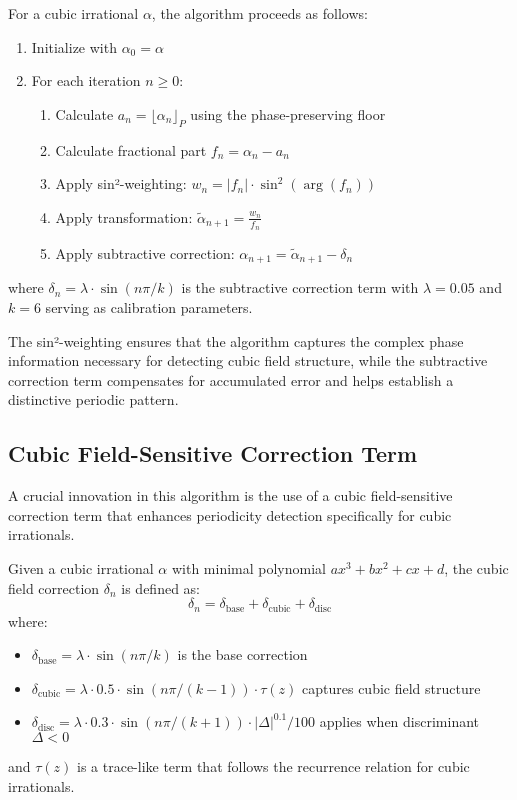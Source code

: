 \begin{algorithm_def}
For a cubic irrational $\alpha$, the algorithm proceeds as follows:
\begin{enumerate}
    \item Initialize with $\alpha_0 = \alpha$
    \item For each iteration $n \geq 0$:
    \begin{enumerate}
        \item Calculate $a_n = \lfloor \alpha_n \rfloor_P$ using the phase-preserving floor
        \item Calculate fractional part $f_n = \alpha_n - a_n$
        \item Apply sin²-weighting: $w_n = |f_n| \cdot \sin^2(\arg(f_n))$
        \item Apply transformation: $\tilde{\alpha}_{n+1} = \frac{w_n}{f_n}$
        \item Apply subtractive correction: $\alpha_{n+1} = \tilde{\alpha}_{n+1} - \delta_n$
    \end{enumerate}
\end{enumerate}
where $\delta_n = \lambda \cdot \sin(n\pi/k)$ is the subtractive correction term with $\lambda = 0.05$ and $k = 6$ serving as calibration parameters.
\end{algorithm_def}

The sin²-weighting ensures that the algorithm captures the complex phase information necessary for detecting cubic field structure, while the subtractive correction term compensates for accumulated error and helps establish a distinctive periodic pattern.

\subsection{Cubic Field-Sensitive Correction Term}

A crucial innovation in this algorithm is the use of a cubic field-sensitive correction term that enhances periodicity detection specifically for cubic irrationals.

\begin{definition}
Given a cubic irrational $\alpha$ with minimal polynomial $ax^3 + bx^2 + cx + d$, the cubic field correction $\delta_n$ is defined as:
\begin{equation}
\delta_n = \delta_{\text{base}} + \delta_{\text{cubic}} + \delta_{\text{disc}}
\end{equation}
where:
\begin{itemize}
    \item $\delta_{\text{base}} = \lambda \cdot \sin(n\pi/k)$ is the base correction
    \item $\delta_{\text{cubic}} = \lambda \cdot 0.5 \cdot \sin(n\pi/(k-1)) \cdot \tau(z)$ captures cubic field structure
    \item $\delta_{\text{disc}} = \lambda \cdot 0.3 \cdot \sin(n\pi/(k+1)) \cdot |\Delta|^{0.1}/100$ applies when discriminant $\Delta < 0$
\end{itemize}
and $\tau(z)$ is a trace-like term that follows the recurrence relation for cubic irrationals.
\end{definition}

